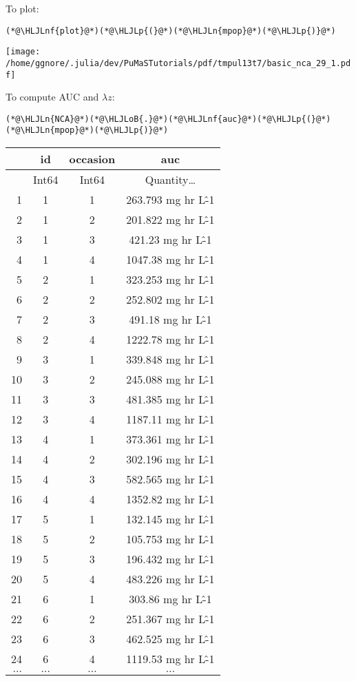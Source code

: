 \documentclass[12pt,a4paper]{article}
\newcommand{\HLJLn}[1]{#1}
\newcommand{\HLJLnf}[1]{\textcolor[RGB]{66,102,213}{#1}}
\newcommand{\HLJLoB}[1]{\textcolor[RGB]{102,102,102}{\textbf{#1}}}
\newcommand{\HLJLp}[1]{#1}
\begin{document}
To plot:


\begin{lstlisting}
(*@\HLJLnf{plot}@*)(*@\HLJLp{(}@*)(*@\HLJLn{mpop}@*)(*@\HLJLp{)}@*)
\end{lstlisting}

\texttt{[image: /home/ggnore/.julia/dev/PuMaSTutorials/pdf/tmpul13t7/basic\_nca\_29\_1.pdf]}

To compute AUC and $\lambda z$:


\begin{lstlisting}
(*@\HLJLn{NCA}@*)(*@\HLJLoB{.}@*)(*@\HLJLnf{auc}@*)(*@\HLJLp{(}@*)(*@\HLJLn{mpop}@*)(*@\HLJLp{)}@*)
\end{lstlisting}


\begin{tabular}{r|ccc}
	& id & occasion & auc\\
	\hline
	& Int64 & Int64 & Quantity…\\
	\hline
	1 & 1 & 1 & 263.793 mg hr L\^-1 \\
	2 & 1 & 2 & 201.822 mg hr L\^-1 \\
	3 & 1 & 3 & 421.23 mg hr L\^-1 \\
	4 & 1 & 4 & 1047.38 mg hr L\^-1 \\
	5 & 2 & 1 & 323.253 mg hr L\^-1 \\
	6 & 2 & 2 & 252.802 mg hr L\^-1 \\
	7 & 2 & 3 & 491.18 mg hr L\^-1 \\
	8 & 2 & 4 & 1222.78 mg hr L\^-1 \\
	9 & 3 & 1 & 339.848 mg hr L\^-1 \\
	10 & 3 & 2 & 245.088 mg hr L\^-1 \\
	11 & 3 & 3 & 481.385 mg hr L\^-1 \\
	12 & 3 & 4 & 1187.11 mg hr L\^-1 \\
	13 & 4 & 1 & 373.361 mg hr L\^-1 \\
	14 & 4 & 2 & 302.196 mg hr L\^-1 \\
	15 & 4 & 3 & 582.565 mg hr L\^-1 \\
	16 & 4 & 4 & 1352.82 mg hr L\^-1 \\
	17 & 5 & 1 & 132.145 mg hr L\^-1 \\
	18 & 5 & 2 & 105.753 mg hr L\^-1 \\
	19 & 5 & 3 & 196.432 mg hr L\^-1 \\
	20 & 5 & 4 & 483.226 mg hr L\^-1 \\
	21 & 6 & 1 & 303.86 mg hr L\^-1 \\
	22 & 6 & 2 & 251.367 mg hr L\^-1 \\
	23 & 6 & 3 & 462.525 mg hr L\^-1 \\
	24 & 6 & 4 & 1119.53 mg hr L\^-1 \\
	$\dots$ & $\dots$ & $\dots$ & $\dots$ \\
\end{tabular}
\end{document}
